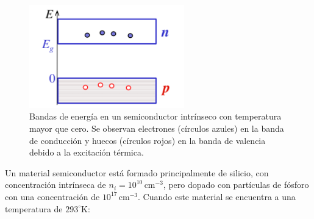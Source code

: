 \documentclass[
  11pt,
  letterpaper,
   addpoints,
   answers
  ]{exam}
\begin{document}
\begin{questions}
\begin{solution}
    \begin{figure}[H]
        \centering
        \includegraphics[width=0.6\textwidth]{../figures/Auxiliar_2_6}
        \caption{Bandas de energía en un semiconductor intrínseco con temperatura mayor que cero. Se observan electrones (círculos azules) en la banda de conducción y huecos (círculos rojos) en la banda de valencia debido a la excitación térmica.}
        \label{fig:bandas_temp}
    \end{figure}

\end{solution}
\question
Un material semiconductor está formado principalmente de silicio, con concentración intrínseca de $n_i = 10^{10}\,\text{cm}^{-3}$, pero dopado con partículas de fósforo con una concentración de $10^{17}\,\text{cm}^{-3}$. Cuando este material se encuentra a una temperatura de $293^\circ \text{K}$:
\begin{solution}

\end{solution}
\end{questions}
\end{document}
